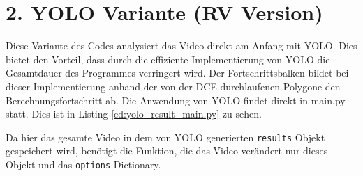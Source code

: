 \section{2. YOLO Variante (RV Version)}{
	\label{py:YOLO_res_vers}
	Diese Variante des Codes analysiert das Video direkt am Anfang mit YOLO. Dies bietet den Vorteil, dass durch die effiziente Implementierung von YOLO die Gesamtdauer des Programmes verringert wird. Der Fortschrittsbalken bildet bei dieser Implementierung anhand der von der DCE durchlaufenen Polygone den Berechnungsfortschritt ab.  Die Anwendung von YOLO findet direkt in main.py statt. \ifimportant Dies ist in Listing \ref{cd:yolo_result_main.py} zu sehen. \fi

	\ifimportant
	
	\fi	

	Da hier das gesamte Video in dem von YOLO generierten \lstinline|results| Objekt gespeichert wird, benötigt die Funktion, die das Video verändert nur dieses Objekt und das \lstinline|options| Dictionary. \\
	

}
